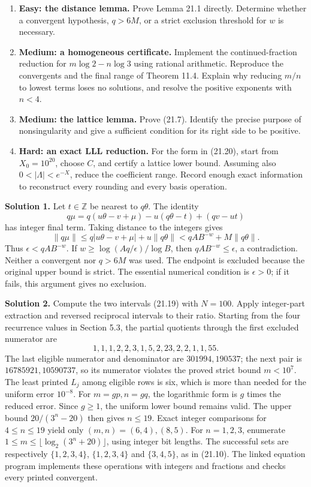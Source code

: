 \documentclass[
  11pt,
  a4paper,
]{article}
\providecommand{\tightlist}{%
  \setlength{\itemsep}{0pt}\setlength{\parskip}{0pt}}
\begin{document}
\begin{enumerate}
\def\labelenumi{\arabic{enumi}.}
\tightlist
\item
  \textbf{Easy: the distance lemma.} Prove Lemma 21.1 directly.
  Determine whether a convergent hypothesis, \(q>6M\), or a strict
  exclusion threshold for \(w\) is necessary.
\item
  \textbf{Medium: a homogeneous certificate.} Implement the
  continued-fraction reduction for \(m\log2-n\log3\) using rational
  arithmetic. Reproduce the convergents and the final range of Theorem
  11.4. Explain why reducing \(m/n\) to lowest terms loses no solutions,
  and resolve the positive exponents with \(n<4\).
\item
  \textbf{Medium: the lattice lemma.} Prove (21.7). Identify the precise
  purpose of nonsingularity and give a sufficient condition for its
  right side to be positive.
\item
  \textbf{Hard: an exact LLL reduction.} For the form in (21.20), start
  from \(X_0=10^{20}\), choose \(C\), and certify a lattice lower bound.
  Assuming also \(0<|\Lambda|<e^{-X}\), reduce the coefficient range.
  Record enough exact information to reconstruct every rounding and
  every basis operation.
\end{enumerate}

\textbf{Solution 1.} Let \(t\in\mathbb Z\) be nearest to \(q\theta\).
The identity \[
 q\mu=q(u\theta-v+\mu)-u(q\theta-t)+(qv-ut)
\] has integer final term. Taking distance to the integers gives \[
 \|q\mu\|\le q|u\theta-v+\mu|+u\|q\theta\|
 <qAB^{-w}+M\|q\theta\|.
\] Thus \(\epsilon<qAB^{-w}\). If \(w\ge\log(Aq/\epsilon)/\log B\), then
\(qAB^{-w}\le\epsilon\), a contradiction. Neither a convergent nor
\(q>6M\) was used. The endpoint is excluded because the original upper
bound is strict. The essential numerical condition is \(\epsilon>0\); if
it fails, this argument gives no exclusion.

\textbf{Solution 2.} Compute the two intervals (21.19) with \(N=100\).
Apply integer-part extraction and reversed reciprocal intervals to their
ratio. Starting from the four recurrence values in Section 5.3, the
partial quotients through the first excluded numerator are \[
 1,1,1,2,2,3,1,5,2,23,2,2,1,1,55.
\] The last eligible numerator and denominator are \(301994,190537\);
the next pair is \(16785921,10590737\), so its numerator violates the
proved strict bound \(m<10^7\). The least printed \(L_j\) among eligible
rows is six, which is more than needed for the uniform error
\(10^{-8}\). For \(m=gp,n=gq\), the logarithmic form is \(g\) times the
reduced error. Since \(g\ge1\), the uniform lower bound remains valid.
The upper bound \(20/(3^n-20)\) then gives \(n\le19\). Exact integer
comparisons for \(4\le n\le19\) yield only \((m,n)=(6,4),(8,5)\). For
\(n=1,2,3\), enumerate \(1\le m\le
\lfloor\log_2(3^n+20)\rfloor\), using integer bit lengths. The
successful sets are respectively \(\{1,2,3,4\}\), \(\{1,2,3,4\}\) and
\(\{3,4,5\}\), as in (21.10). The linked equation program implements
these operations with integers and fractions and checks every printed
convergent.
\end{document}
